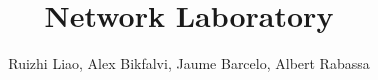\documentclass[a4paper,12pt]{book}
\begin{document}
\frontmatter
\pagestyle{empty}

\title{\textbf{Network Laboratory}}
\author{Ruizhi Liao, Alex Bikfalvi, Jaume Barcelo, Albert Rabassa}
\maketitle

\tableofcontents

\mainmatter







\backmatter


\end{document}
